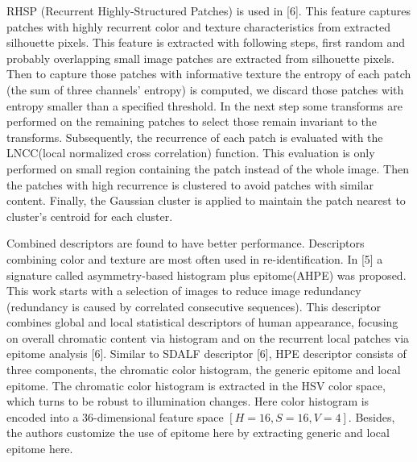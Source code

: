 RHSP (Recurrent Highly-Structured Patches) is used in [6]. This feature captures patches with highly recurrent color and texture characteristics from extracted silhouette pixels. This feature is extracted with following steps, first random and probably overlapping small image patches are extracted from silhouette pixels. Then to capture those patches with informative texture the entropy of each patch (the sum of three channels' entropy) is computed, we discard those patches with entropy smaller than a specified threshold. In the next step some transforms are performed on the remaining patches to select those remain invariant to the transforms. Subsequently, the recurrence of each patch is evaluated with the LNCC(local normalized cross correlation) function. This evaluation is only performed on small region containing the patch instead of the whole image. Then the patches with high recurrence is clustered to avoid patches with similar content. Finally, the Gaussian cluster is applied to maintain the patch nearest to cluster's centroid for each cluster.
 
Combined descriptors are found to have better performance. Descriptors combining color and texture are most often used in re-identification. In [5] a signature called asymmetry-based histogram plus epitome(AHPE) was proposed. This work starts with a selection of images to reduce image redundancy (redundancy is caused by correlated consecutive sequences). This descriptor combines global and local statistical descriptors of human appearance, focusing on overall chromatic content via histogram and on the recurrent local patches via epitome analysis [6]. Similar to SDALF descriptor [6], HPE descriptor consists of three components, the chromatic color histogram, the generic epitome and local epitome. The chromatic color histogram is extracted in the HSV color space, which turns to be robust to illumination changes. Here color histogram is encoded into a 36-dimensional feature space $[H=16,  S=16,  V=4]$. Besides, the authors customize the use of epitome here by extracting generic and local epitome here. 

